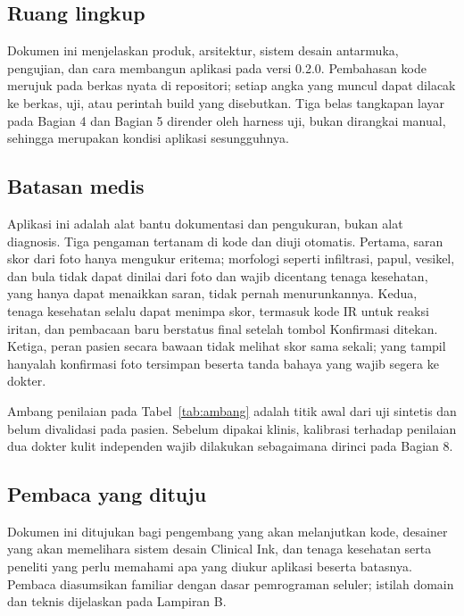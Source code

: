 \documentclass[11pt,a4paper]{article}
\begin{document}
\subsection{Ruang lingkup}

Dokumen ini menjelaskan produk, arsitektur, sistem desain antarmuka, pengujian,
dan cara membangun aplikasi pada versi 0.2.0. Pembahasan kode merujuk pada berkas
nyata di repositori; setiap angka yang muncul dapat dilacak ke berkas, uji, atau
perintah build yang disebutkan. Tiga belas tangkapan layar pada Bagian 4 dan Bagian 5
dirender oleh harness uji, bukan dirangkai manual, sehingga merupakan kondisi
aplikasi sesungguhnya.

\subsection{Batasan medis}

Aplikasi ini adalah alat bantu dokumentasi dan pengukuran, bukan alat diagnosis.
Tiga pengaman tertanam di kode dan diuji otomatis. Pertama, saran skor dari foto
hanya mengukur eritema; morfologi seperti infiltrasi, papul, vesikel, dan bula
tidak dapat dinilai dari foto dan wajib dicentang tenaga kesehatan, yang hanya
dapat menaikkan saran, tidak pernah menurunkannya. Kedua, tenaga kesehatan selalu
dapat menimpa skor, termasuk kode IR untuk reaksi iritan, dan pembacaan baru
berstatus final setelah tombol Konfirmasi ditekan. Ketiga, peran pasien secara
bawaan tidak melihat skor sama sekali; yang tampil hanyalah konfirmasi foto
tersimpan beserta tanda bahaya yang wajib segera ke dokter.

Ambang penilaian pada Tabel~\ref{tab:ambang} adalah titik awal dari uji sintetis
dan belum divalidasi pada pasien. Sebelum dipakai klinis, kalibrasi terhadap
penilaian dua dokter kulit independen wajib dilakukan sebagaimana dirinci pada
Bagian 8.

\subsection{Pembaca yang dituju}

Dokumen ini ditujukan bagi pengembang yang akan melanjutkan kode, desainer yang
akan memelihara sistem desain Clinical Ink, dan tenaga kesehatan serta peneliti
yang perlu memahami apa yang diukur aplikasi beserta batasnya. Pembaca diasumsikan
familiar dengan dasar pemrograman seluler; istilah domain dan teknis dijelaskan
pada Lampiran B.

\end{document}
